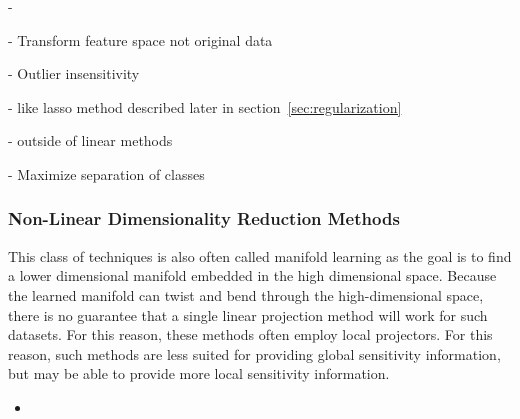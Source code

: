  - 

 - Transform feature space not original data

 - Outlier insensitivity

 - like lasso method described later in section~\ref{sec:regularization}

 - outside of linear methods ~\cite{HyvarinenKarhunenOja2001}


 - Maximize separation of classes



\subsubsection{Non-Linear Dimensionality Reduction Methods}

This class of techniques is also often called manifold learning as the goal is to find a lower dimensional manifold embedded in the high dimensional space.
%
Because the learned manifold can twist and bend through the high-dimensional space, there is no guarantee that a single linear projection method will work for such datasets.
%
For this reason, these methods often employ local projectors.
%
For this reason, such methods are less suited for providing global sensitivity information, but may be able to provide more local sensitivity information.







\begin{itemize}
\item{}
\end{itemize}

